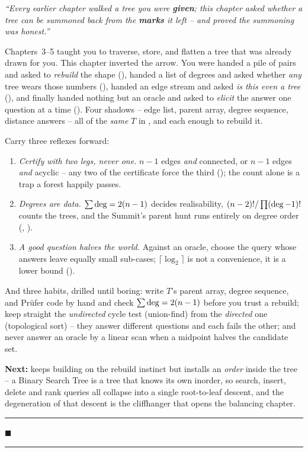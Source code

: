 \begin{lastword}
\emph{``Every earlier chapter walked a tree you were \textbf{given}; this chapter asked whether a
tree can be summoned back from the \textbf{marks} it left -- and proved the summoning was honest.''}

\medskip
Chapters~3--5 taught you to traverse, store, and flatten a tree that was already drawn for you.
This chapter inverted the arrow. You were handed a pile of pairs and asked to \emph{rebuild} the
shape (), handed a list of degrees and asked whether \emph{any} tree wears those
numbers (), handed an edge stream and asked \emph{is this even a tree}
(), and finally handed nothing but an oracle and asked to \emph{elicit} the
answer one question at a time (). Four shadows -- edge list, parent array, degree
sequence, distance answers -- all of the \emph{same} $T$ in , and each enough to
rebuild it.

\medskip
Carry three reflexes forward:
\begin{enumerate}[nosep, leftmargin=1.6em]
  \item \emph{Certify with two legs, never one.} $n-1$ edges \emph{and} connected, or $n-1$ edges
        \emph{and} acyclic -- any two of the certificate force the third (); the
        count alone is a trap a forest happily passes.
  \item \emph{Degrees are data.} $\sum\operatorname{deg}=2(n-1)$ decides realisability, $(n-2)!/\prod(\operatorname{deg}-1)!$
        counts the trees, and the Summit's parent hunt runs entirely on degree order
        (, ).
  \item \emph{A good question halves the world.} Against an oracle, choose the query whose answers
        leave equally small sub-cases; $\lceil\log_2\rceil$ is not a convenience, it is a
        lower bound ().
\end{enumerate}

\medskip
And three habits, drilled until boring: write $T$'s parent array, degree sequence, and Pr\"ufer
code by hand and check $\sum\operatorname{deg}=2(n-1)$ before you trust a rebuild; keep straight the
\emph{undirected} cycle test (union-find) from the \emph{directed} one (topological sort) -- they
answer different questions and each fails the other; and never answer an oracle by a linear scan
when a midpoint halves the candidate set.

\medskip
\textbf{Next:}  keeps building on the rebuild instinct but installs an \emph{order} inside
the tree -- a Binary Search Tree is a tree that knows its own inorder, so search, insert, delete and
rank queries all collapse into a single root-to-leaf descent, and the degeneration of that descent is
the cliffhanger that opens the balancing chapter.

\begin{center}\textcolor{softpurple}{\rule{0.4\linewidth}{0.6pt}\quad $\blacksquare$\quad \rule{0.4\linewidth}{0.6pt}}\end{center}
\end{lastword}
